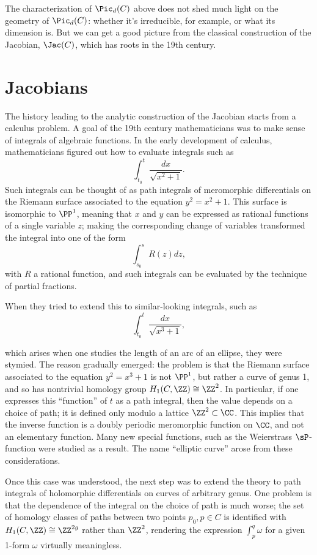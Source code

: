 The characterization of $\Pic_d(C)$ above does not shed much light on the geometry of $\Pic_d(C)$: whether it's irreducible, for example, or what its dimension is. But we can get a  good picture from the classical construction of the Jacobian, $\Jac(C)$, which has roots in the 19th century.
 
\section{Jacobians}

The history leading to the analytic construction of the Jacobian starts from a calculus problem. A goal of the 19th century mathematicians was  to make sense of integrals of algebraic functions. In the early development of calculus, mathematicians figured out how to evaluate  integrals such as
$$
\int_{t_0}^t \frac{dx}{\sqrt{x^2+1}}.
$$
Such integrals can be thought of as path integrals of meromorphic differentials on the Riemann surface associated to the equation $y^2 = x^2+1$. This surface is isomorphic to $\PP^1$, meaning that $x$ and $y$ can be expressed as rational functions of a single variable $z$; making the corresponding change of variables transformed the integral into one of the form
$$
\int_{s_0}^s R(z)dz,
$$
with $R$ a rational function, and such integrals can be evaluated by the technique of partial fractions.

When they tried to extend this to similar-looking integrals, such as
$$
\int_{t_0}^t \frac{dx}{\sqrt{x^3+1}},
$$


which arises when one studies the length of an arc of an ellipse, they were stymied. The reason gradually emerged: the problem is that the Riemann surface associated to the equation $y^2 = x^3+1$ is not $\PP^1$, but rather a curve of genus 1, and so has nontrivial homology group $H_1(C, \ZZ) \cong \ZZ^2$. In particular, if one expresses this ``function'' of $t$  as a path integral, then the value depends on a choice of path; it is defined only modulo a lattice $\ZZ^2 \subset \CC$. This implies that the inverse function is a doubly periodic meromorphic function on $\CC$, and not an elementary function. Many new special functions, such as the Weierstrass $\sP$-function were studied as a result. The name ``elliptic curve'' arose from these considerations.

Once this case was understood, the next step was to extend the theory to path integrals of holomorphic differentials on curves of arbitrary genus. One problem is that the dependence of the integral on the choice of path is much worse; the set of homology classes of paths between two points $p_0, p \in C$ is identified with $H_1(C,\ZZ) \cong \ZZ^{2g}$ rather than $\ZZ^2$, rendering the expression $\int_p^q \omega$ for a given 1-form $\omega$ virtually meaningless.

